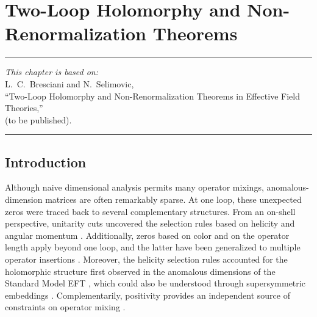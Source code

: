 \chapter{Two-Loop Holomorphy and Non-Renormalization Theorems\label{ch:2looptheorems}}

\begin{flushright}
\small

{\color{chapterpaperrule}\rule{\textwidth}{0.5pt}}

\textit{This chapter is based on:}\\[0.5em]
L.~C.~Bresciani and N.~Selimovic,\\[0pt]
``Two-Loop Holomorphy and Non-Renormalization Theorems in Effective Field Theories,''\\[0pt]
(to be published).

{\color{chapterpaperrule}\rule{\textwidth}{0.5pt}}
\end{flushright}

\section{Introduction}

Although 
naive dimensional analysis
permits many operator mixings, anomalous-dimension matrices are often remarkably sparse. 
At one loop, these unexpected zeros were traced back to several complementary structures. 
From an on-shell perspective, unitarity cuts uncovered the selection rules based on helicity \cite{Cheung:2015aba} and angular momentum \cite{Jiang:2020rwz}. 
Additionally, zeros based on color \cite{Bern:2020ikv} and on the operator length \cite{Bern:2019wie} apply beyond one loop, and the latter have been generalized to multiple operator insertions \cite{Cao:2023adc}.
Moreover, the helicity selection rules accounted for the holomorphic structure first observed in the anomalous dimensions of the Standard Model EFT \cite{Jenkins:2013zja,Jenkins:2013wua,Alonso:2013hga,Alonso:2014rga}, which could also be understood through supersymmetric embeddings \cite{Elias-Miro:2014eia}. Complementarily, positivity provides an independent source of constraints on operator mixing \cite{Chala:2023jyx,Chala:2023xjy,Liao:2025npz}. 


